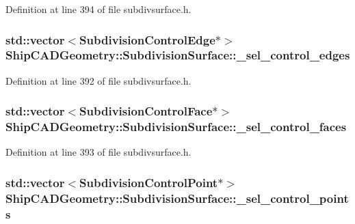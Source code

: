 Definition at line 394 of file subdivsurface.\-h.

\hypertarget{classShipCADGeometry_1_1SubdivisionSurface_a0a93da68dbd5f8f29a2834a9410353d1}{
\subsubsection[{\-\_\-sel\-\_\-control\-\_\-edges}]{\setlength{\rightskip}{0pt plus 5cm}std\-::vector$<${\bf Subdivision\-Control\-Edge}$\ast$$>$ Ship\-C\-A\-D\-Geometry\-::\-Subdivision\-Surface\-::\-\_\-sel\-\_\-control\-\_\-edges\hspace{0.3cm}{\ttfamily [protected]}}}\label{classShipCADGeometry_1_1SubdivisionSurface_a0a93da68dbd5f8f29a2834a9410353d1}


Definition at line 392 of file subdivsurface.\-h.

\hypertarget{classShipCADGeometry_1_1SubdivisionSurface_ad923194e92a6a88cbc9608c13a70436f}{
\subsubsection[{\-\_\-sel\-\_\-control\-\_\-faces}]{\setlength{\rightskip}{0pt plus 5cm}std\-::vector$<${\bf Subdivision\-Control\-Face}$\ast$$>$ Ship\-C\-A\-D\-Geometry\-::\-Subdivision\-Surface\-::\-\_\-sel\-\_\-control\-\_\-faces\hspace{0.3cm}{\ttfamily [protected]}}}\label{classShipCADGeometry_1_1SubdivisionSurface_ad923194e92a6a88cbc9608c13a70436f}


Definition at line 393 of file subdivsurface.\-h.

\hypertarget{classShipCADGeometry_1_1SubdivisionSurface_a0a79167ca5f6a2604752a803dcc065da}{
\subsubsection[{\-\_\-sel\-\_\-control\-\_\-points}]{\setlength{\rightskip}{0pt plus 5cm}std\-::vector$<${\bf Subdivision\-Control\-Point}$\ast$$>$ Ship\-C\-A\-D\-Geometry\-::\-Subdivision\-Surface\-::\-\_\-sel\-\_\-control\-\_\-points\hspace{0.3cm}{\ttfamily [protected]}}}\label{classShipCADGeometry_1_1SubdivisionSurface_a0a79167ca5f6a2604752a803dcc065da}


